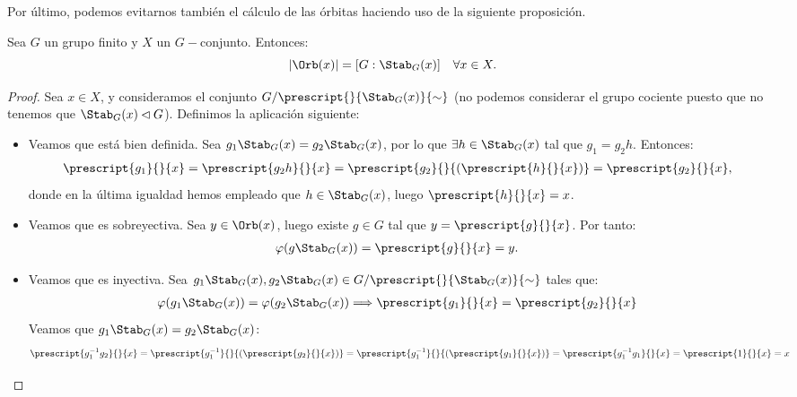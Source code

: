 \begin{ejercicio}
    Por último, podemos evitarnos también el cálculo de las órbitas haciendo uso de la siguiente proposición.
    \begin{prop}
        Sea \(G\) un grupo finito y \(X\) un \(G-\)conjunto. Entonces:
        \begin{equation*}
            |\Orb(x)| = [G: \Stab_G(x)] \quad \forall x\in X.
        \end{equation*}
        \begin{proof}
            Sea \(x\in X\), y consideramos el conjunto $G/\prescript{}{\Stab_G(x)}{\sim}$ (no podemos considerar el grupo cociente puesto que no tenemos que \(\Stab_G(x)\lhd G\)). Definimos la aplicación siguiente:
            \begin{itemize}
                \item Veamos que está bien definida. Sea \(g_1\Stab_G(x) = g_2\Stab_G(x)\), por lo que $\exists h\in \Stab_G(x)$ tal que \(g_1 = g_2 h\). Entonces:
                \begin{align*}
                    \prescript{g_1}{}{x} &= \prescript{g_2 h}{}{x} = \prescript{g_2}{}{\left(\prescript{h}{}{x}\right)} = \prescript{g_2}{}{x},
                \end{align*}
                donde en la última igualdad hemos empleado que \(h\in \Stab_G(x)\), luego \(\prescript{h}{}{x} = x\).
                \item Veamos que es sobreyectiva. Sea \(y\in \Orb(x)\), luego existe \(g\in G\) tal que \(y = \prescript{g}{}{x}\). Por tanto:
                \begin{align*}
                    \varphi(g\Stab_G(x)) &= \prescript{g}{}{x} = y.
                \end{align*}
                \item Veamos que es inyectiva. Sea \(g_1\Stab_G(x), g_2\Stab_G(x)\in G/\prescript{}{\Stab_G(x)}{\sim}\) tales que:
                \begin{align*}
                    \varphi(g_1\Stab_G(x)) &= \varphi(g_2\Stab_G(x))
                    \Longrightarrow \prescript{g_1}{}{x} = \prescript{g_2}{}{x}
                \end{align*}
                Veamos que \(g_1\Stab_G(x) = g_2\Stab_G(x)\):
                \begin{align*}
                    \prescript{g_1^{-1}g_2}{}{x} &= \prescript{g_1^{-1}}{}{\left(\prescript{g_2}{}{x}\right)} = \prescript{g_1^{-1}}{}{\left(\prescript{g_1}{}{x}\right)} = \prescript{g_1^{-1}g_1}{}{x} = \prescript{1}{}{x} = x

\end{align*}
\end{itemize}
\end{proof}
\end{prop}
\end{ejercicio}
